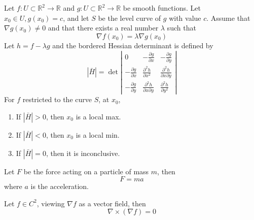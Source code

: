 \documentclass[openany]{book}
\newcommand{\R}{\mathbb{R}}
\begin{document}
\begin{prop}
    Let $f: U\subset\R^2\to\R$ and $g:U\subset\R^2\to\R$ be smooth functions. Let $x_0\in U, g(x_0)=c$, and let $S$ be the level curve of $g$ with value $c$. Assume that $\nabla g(x_0)\neq 0$ and that there exists a real number $\lambda$ such that 
    \begin{equation*}
        \nabla f(x_0)=\lambda\nabla g(x_0)
    \end{equation*}
    Let $h=f-\lambda g$ and the bordered Hessian determinant is defined by 
    \begin{equation*}
        |\bar{H}|=\det\left|\begin{matrix}
            0&-\frac{\partial g}{\partial x}&-\frac{\partial g}{\partial y}\\
            -\frac{\partial g}{\partial x} &\frac{\partial^2h}{\partial x^2}&\frac{\partial^2h}{\partial x\partial y}\\
            -\frac{\partial g}{\partial y} &\frac{\partial^2h}{\partial x\partial y}&\frac{\partial^2h}{\partial y^2}
        \end{matrix} \right|
    \end{equation*}
    For $f$ restricted to the curve $S$, at $x_0$,
    \begin{enumerate}
        \item If  $|\bar{H}|>0$, then $x_0$ is a local max.
        \item If $|\bar{H}|<0$, then $x_0$ is a local min.
        \item If $|\bar{H}|=0$, then it is inconclusive.
    \end{enumerate}
\end{prop}


\begin{prop}
    Let $F$ be the force acting on a particle of mass $m$, then 
    \begin{equation*}
        F=ma
    \end{equation*}
    where $a$ is the acceleration.
\end{prop}



\begin{prop}
    Let $f\in C^2$, viewing $\nabla f$ as a vector field, then
    \begin{equation*}
        \nabla\times(\nabla f)=0
    \end{equation*}    
\end{prop}
\end{document}
